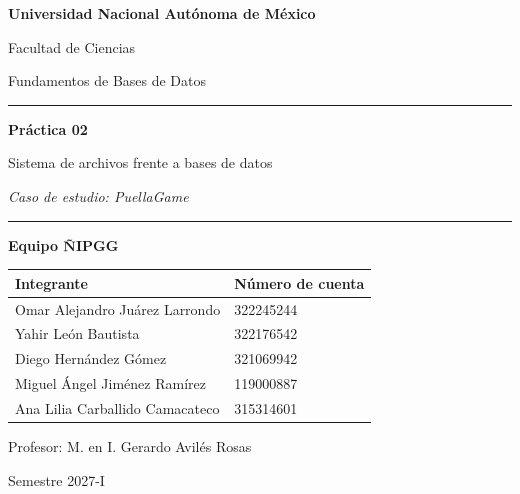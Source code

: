 \begin{titlepage}
  \centering
  {\Large\bfseries Universidad Nacional Autónoma de México\par}
  \vspace{0.35cm}
  {\large Facultad de Ciencias\par}
  \vspace{0.2cm}
  {\large Fundamentos de Bases de Datos\par}

  \vspace{2.1cm}
  \rule{\textwidth}{1pt}\par
  \vspace{0.55cm}
  {\Huge\bfseries Práctica 02\par}
  \vspace{0.3cm}
  {\LARGE Sistema de archivos frente a bases de datos\par}
  \vspace{0.35cm}
  {\Large\itshape Caso de estudio: PuellaGame\par}
  \vspace{0.55cm}
  \rule{\textwidth}{1pt}\par

  \vspace{1.6cm}
  {\large\bfseries Equipo ÑIPGG\par}
  \vspace{0.7cm}
  \begin{tabular}{@{}ll@{}}
    \textbf{Integrante} & \textbf{Número de cuenta} \\
    \hline
    Omar Alejandro Juárez Larrondo & 322245244 \\
    Yahir León Bautista & 322176542 \\
    Diego Hernández Gómez & 321069942 \\
    Miguel Ángel Jiménez Ramírez & 119000887 \\
    Ana Lilia Carballido Camacateco & 315314601 \\
  \end{tabular}

  \vfill
  {\large Profesor: M. en I. Gerardo Avilés Rosas\par}
  \vspace{0.3cm}
  {\large Semestre 2027-I\par}
\end{titlepage}
